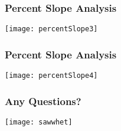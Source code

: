 \documentclass[t]{beamer} %
\begin{document}

\begin{frame}
\frametitle{Percent Slope Analysis}
\vspace{-0.45in}
\center
\texttt{[image: percentSlope3]} 
\end{frame}


\begin{frame}
\frametitle{Percent Slope Analysis}
\vspace{-0.4in}
\center
\texttt{[image: percentSlope4]} 
\end{frame}


\begin{frame}
\frametitle{Any Questions?}
\vspace{-0.3in}
\center
\texttt{[image: sawwhet]}
\end{frame}


%
%
%


\end{document}
